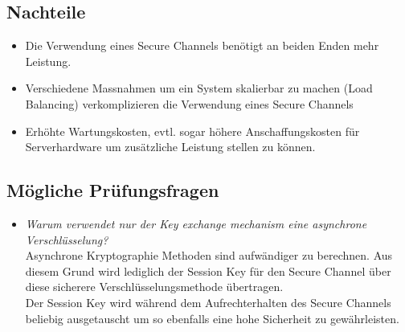\subsection*{Nachteile}
\begin{itemize}
	\item Die Verwendung eines Secure Channels benötigt an beiden Enden mehr Leistung.
	\item Verschiedene Massnahmen um ein System skalierbar zu machen (Load Balancing) verkomplizieren die Verwendung eines Secure Channels
	\item Erhöhte Wartungskosten, evtl. sogar höhere Anschaffungskosten für Serverhardware um zusätzliche Leistung stellen zu können.
\end{itemize}

\subsection*{Mögliche Prüfungsfragen}
\begin{itemize}
	\item \emph{Warum verwendet nur der Key exchange mechanism eine asynchrone Verschlüsselung?}\\
	Asynchrone Kryptographie Methoden sind aufwändiger zu berechnen. Aus diesem Grund wird lediglich der Session Key für den Secure Channel über diese sicherere Verschlüsselungsmethode übertragen.\\Der Session Key wird während dem Aufrechterhalten des Secure Channels beliebig ausgetauscht um so ebenfalls eine hohe Sicherheit zu gewährleisten.
\end{itemize}